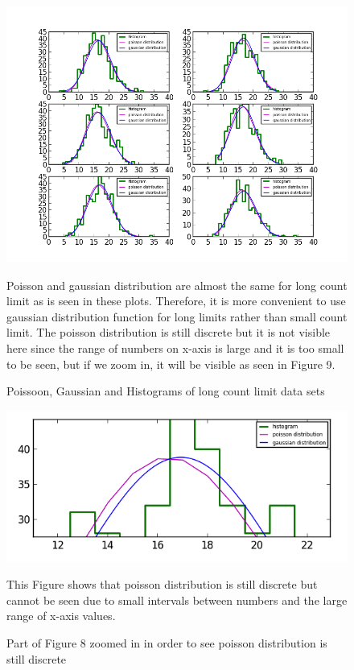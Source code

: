 \documentclass[letterpaper,12pt]{article}
\begin{document}
 \begin{figure}
\centering
\includegraphics[scale=0.9]{poisson-gaussian-histograms-8-long.png}
\caption{Poissoon, Gaussian and Histograms of long count limit data sets}
Poisson and gaussian distribution are almost the same for long count limit as is seen in these plots. Therefore, it is more convenient to use gaussian distribution function for long limits rather than small count limit. The poisson distribution is still discrete but it is not visible here since the range of numbers on x-axis is large and it is too small to be seen, but if we zoom in, it will be visible as seen in Figure 9.
\end{figure}

\begin{figure}
\centering
\includegraphics[scale=0.9]{part8-long-zoomedin.png}
\caption{Part of Figure 8 zoomed in in order to see poisson distribution is still discrete}
This Figure shows that poisson distribution is still discrete but cannot be seen due to small intervals between numbers and the large range of x-axis values.
\end{figure}
 
\end{document}

